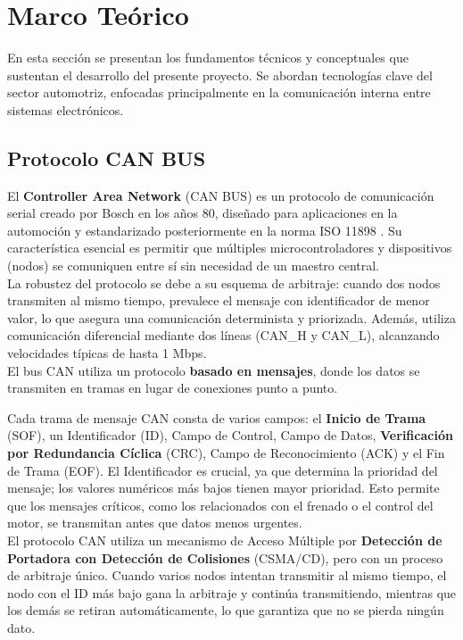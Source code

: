 \section{Marco Teórico}

En esta sección se presentan los fundamentos técnicos y conceptuales que sustentan el desarrollo del presente proyecto. Se abordan tecnologías clave del sector automotriz, enfocadas principalmente en la comunicación interna entre sistemas electrónicos.

\subsection{Protocolo CAN BUS}

El \textbf{Controller Area Network} (CAN BUS) es un protocolo de comunicación serial creado por Bosch en los años 80, diseñado para aplicaciones en la automoción y estandarizado posteriormente en la norma ISO 11898 \cite{iso11898}. Su característica esencial es permitir que múltiples microcontroladores y dispositivos (nodos) se comuniquen entre sí sin necesidad de un maestro central.\\

La robustez del protocolo se debe a su esquema de arbitraje: cuando dos nodos transmiten al mismo tiempo, prevalece el mensaje con identificador de menor valor, lo que asegura una comunicación determinista y priorizada. Además, utiliza comunicación diferencial mediante dos líneas (CAN\_H y CAN\_L), alcanzando velocidades típicas de hasta 1 Mbps.\\

El bus CAN utiliza un protocolo \textbf{basado en mensajes}, donde los datos se transmiten en tramas en lugar de conexiones punto a punto. 

Cada trama de mensaje CAN consta de varios campos: el \textbf{Inicio de Trama} (SOF), un Identificador (ID), Campo de Control, Campo de Datos, \textbf{Verificación por Redundancia Cíclica} (CRC), Campo de Reconocimiento (ACK) y el Fin de Trama (EOF). El Identificador es crucial, ya que determina la prioridad del mensaje; los valores numéricos más bajos tienen mayor prioridad. Esto permite que los mensajes críticos, como los relacionados con el frenado o el control del motor, se transmitan antes que datos menos urgentes. \\

El protocolo CAN utiliza un mecanismo de Acceso Múltiple por \textbf{Detección de Portadora con Detección de Colisiones} (CSMA/CD), pero con un proceso de arbitraje único. Cuando varios nodos intentan transmitir al mismo tiempo, el nodo con el ID más bajo gana la arbitraje y continúa transmitiendo, mientras que los demás se retiran automáticamente, lo que garantiza que no se pierda ningún dato.\\


